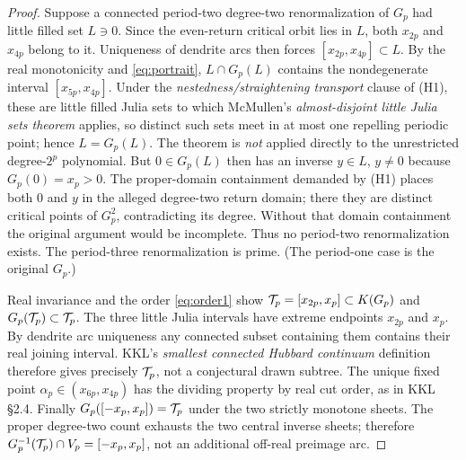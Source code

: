 \begin{proof}
Suppose a connected period-two degree-two
renormalization of $G_p$ had little filled set
$L\ni0$.  Since the even-return critical orbit
lies in $L$, both $x_{2p}$ and $x_{4p}$
belong to it.  Uniqueness of dendrite arcs
then forces $[x_{2p},x_{4p}]\subset L$.
By the real monotonicity and \eqref{eq:portrait},
$L\cap G_p(L)$ contains the nondegenerate
interval $[x_{5p},x_{4p}]$.
Under the \emph{nestedness/straightening
transport} clause of (H1), these are
little filled Julia sets to which
McMullen's \emph{almost-disjoint little Julia
sets theorem} \cite[Theorem 7.3]{McMullen1994}
applies, so distinct such sets meet in
at most one repelling periodic point;
hence $L=G_p(L)$.  The theorem is
\emph{not} applied directly to the
unrestricted degree-$2^p$ polynomial.
But $0\in G_p(L)$ then has an inverse
$y\in L$, $y\ne0$ because $G_p(0)=x_p>0$.
The proper-domain containment demanded
by (H1) places both $0$ and $y$ in
the alleged degree-two return domain;
there they are distinct critical points
of $G_p^2$, contradicting its degree.
Without that domain containment the
original argument would be incomplete.
Thus no period-two renormalization exists.
The period-three renormalization is prime.
(The period-one case is the original $G_p$.)

Real invariance and the order \eqref{eq:order1}
show $\mathcal T_p=[x_{2p},x_p]\subset K(G_p)$ and
$G_p(\mathcal T_p)\subset\mathcal T_p$.  The three little
Julia intervals have extreme endpoints
$x_{2p}$ and $x_p$.  By dendrite arc
uniqueness any connected subset containing
them contains their real joining interval.
KKL's \emph{smallest connected Hubbard
continuum} definition
\cite[\S2.5]{KKL2026} therefore gives
precisely $\mathcal T_p$, not a conjectural drawn
subtree.  The unique fixed point
$\alpha_p\in(x_{6p},x_{4p})$ has the
dividing property by real cut order, as
in KKL \S2.4.  Finally
$G_p([-x_p,x_p])=\mathcal T_p$
under the two strictly monotone sheets.
The proper degree-two count exhausts
the two central inverse sheets; therefore
$G_p^{-1}(\mathcal T_p)\cap V_p=[-x_p,x_p]$,
not an additional off-real preimage arc.


\end{proof}
